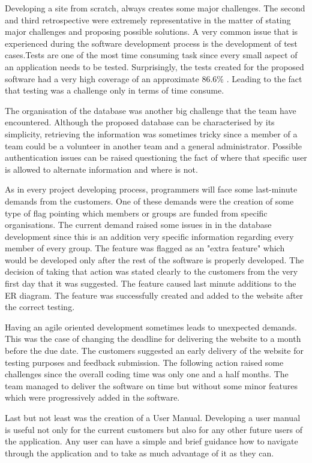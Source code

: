 \documentclass{l3proj}
\begin{document}
Developing a site from scratch, always creates some major challenges. The second and third retrospective were extremely representative in the matter of stating major challenges and proposing possible solutions. A very common issue that is experienced during the software development process is the development of test cases.Tests are one of the most time consuming task since every small aspect of an application needs to be tested. Surprisingly, the tests created for the proposed software had a very high coverage of an approximate 86.6\% . Leading to the fact that testing was a challenge only in terms of time consume.

The organisation of the database was another big challenge that the team have encountered. Although the proposed database can be characterised by its simplicity, retrieving the information was sometimes tricky since a member of a team could be a volunteer in another team and a general administrator. Possible authentication issues can be raised questioning the fact of where that specific user is allowed to alternate information and where is not.

As in every project developing process, programmers will face some last-minute demands from the customers. One of these demands were the creation of some type of flag pointing which members or groups are funded from specific organisations. The current demand raised some issues in in the database development since this is an addition very specific information regarding every member of every group. The feature was flagged as an  "extra feature" which would be developed only after the rest of the software is properly developed. The decision of taking that action was stated clearly to the customers from the very first day that it was suggested. The feature caused last minute additions to the ER diagram. The feature was successfully created and added to the website after the correct testing.

Having an agile oriented development sometimes leads to unexpected demands. This was the case of changing the deadline for delivering the website to a month before the due date. The customers suggested an early delivery of the website for testing purposes and feedback submission. The following action raised some challenges since the overall coding time was only one and a half months. The team managed to deliver the software on time but without some minor features which were progressively added in the software.

Last but not least was the creation of a User Manual. Developing a user manual is useful not only for the current customers but also for any other future users of the application. Any user can have a simple and brief guidance how to navigate through the application and to take as much advantage of it as they can.
\end{document}
